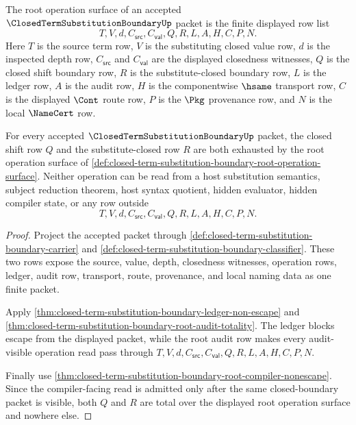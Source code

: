 \begin{definition}
\label{def:closed-term-substitution-boundary-root-operation-surface}
The root operation surface of an accepted $\ClosedTermSubstitutionBoundaryUp$ packet is the finite displayed row list
$$
T,V,d,C_{\mathsf{src}},C_{\mathsf{val}},Q,R,L,A,H,C,P,N.
$$
Here $T$ is the source term row, $V$ is the substituting closed value row, $d$ is the inspected depth row, $C_{\mathsf{src}}$ and $C_{\mathsf{val}}$ are the displayed closedness witnesses, $Q$ is the closed shift boundary row, $R$ is the substitute-closed boundary row, $L$ is the ledger row, $A$ is the audit row, $H$ is the componentwise $\hsame$ transport row, $C$ is the displayed $\Cont$ route row, $P$ is the $\Pkg$ provenance row, and $N$ is the local $\NameCert$ row.
\end{definition}

\begin{theorem}
\label{thm:closed-term-substitution-boundary-root-operation-totality}
For every accepted $\ClosedTermSubstitutionBoundaryUp$ packet, the closed shift row $Q$ and the substitute-closed row $R$ are both exhausted by the root operation surface of \autoref{def:closed-term-substitution-boundary-root-operation-surface}. Neither operation can be read from a host substitution semantics, subject reduction theorem, host syntax quotient, hidden evaluator, hidden compiler state, or any row outside
$$
T,V,d,C_{\mathsf{src}},C_{\mathsf{val}},Q,R,L,A,H,C,P,N.
$$
\end{theorem}
\begin{proof}
Project the accepted packet through \autoref{def:closed-term-substitution-boundary-carrier} and \autoref{def:closed-term-substitution-boundary-classifier}. These two rows expose the source, value, depth, closedness witnesses, operation rows, ledger, audit row, transport, route, provenance, and local naming data as one finite packet.

Apply \autoref{thm:closed-term-substitution-boundary-ledger-non-escape} and \autoref{thm:closed-term-substitution-boundary-root-audit-totality}. The ledger blocks escape from the displayed packet, while the root audit row makes every audit-visible operation read pass through $T,V,d,C_{\mathsf{src}},C_{\mathsf{val}},Q,R,L,A,H,C,P,N$.

Finally use \autoref{thm:closed-term-substitution-boundary-root-compiler-nonescape}. Since the compiler-facing read is admitted only after the same closed-boundary packet is visible, both $Q$ and $R$ are total over the displayed root operation surface and nowhere else.
\end{proof}

